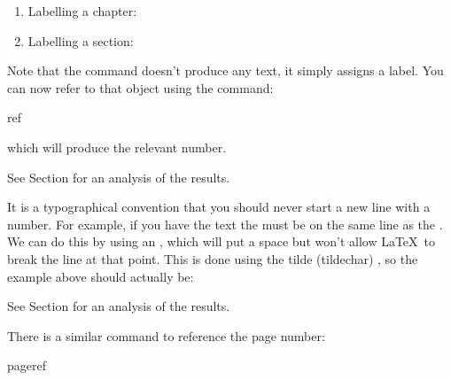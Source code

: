 
\begin{enumerate}
\item Labelling a chapter:

\begin{code}
\begin{alltt}
\end{alltt}
\end{code}

\item Labelling a section:

\begin{code}
\begin{alltt}
\end{alltt}
\end{code}
\end{enumerate}

Note that the  command doesn't produce any text, it
simply assigns a label.  You can now refer to that object
using the command:
\begin{definition}
\gls{ref}
\end{definition}
which will produce the relevant number.

\begin{codeS}
See Section  for an analysis
of the results.
\end{codeS}
\label{cmd:tilde}%
It is a typographical convention that you should never
start a new line with a number.  For example,
if you have the text  the  must
be on the same line as the .  We can 
do this by using an , which will
put a space but won't allow \LaTeX\ to break the line at
that point.  This is done using the tilde (\gls{tildechar}) 
,
so the example above should actually be:\bookpagebreak
\begin{codeS}
See Section for an analysis
of the results.
\end{codeS}
There is a similar command to reference the page number:
\begin{definition}
\gls{pageref}
\end{definition}

